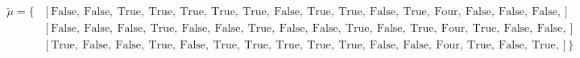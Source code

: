 \begin{equation}
\nonumber
\begin{aligned}
\tilde{\mu} = \{  & \left[\text{False}, \ \text{False}, \ \text{True}, \ \text{True}, \ \text{True}, \ \text{True}, \ \text{True}, \ \text{False}, \ \text{True}, \ \text{True}, \ \text{False}, \ \text{True}, \ \text{Four}, \ \text{False}, \ \text{False}, \ \text{False}, \right] \\  & \left[\text{False}, \ \text{False}, \ \text{False}, \ \text{True}, \ \text{False}, \ \text{False}, \ \text{True}, \ \text{False}, \ \text{False}, \ \text{True}, \ \text{False}, \ \text{True}, \ \text{Four}, \ \text{True}, \ \text{False}, \ \text{False}, \right] \\  & \left[\text{True}, \ \text{False}, \ \text{False}, \ \text{True}, \ \text{False}, \ \text{True}, \ \text{True}, \ \text{True}, \ \text{True}, \ \text{True}, \ \text{False}, \ \text{False}, \ \text{Four}, \ \text{True}, \ \text{False}, \ \text{True}, \right] \} \\ 
\end{aligned}
\end{equation} \\ 